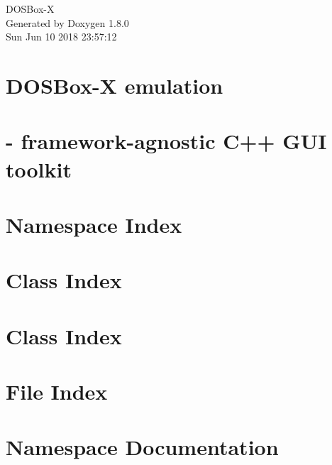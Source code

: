 \documentclass{book}
\begin{document}
\hypersetup{pageanchor=false,citecolor=blue}
\begin{titlepage}
\vspace*{7cm}
\begin{center}
{\Large D\-O\-S\-Box-\/\-X }\\
\vspace*{1cm}
{\large Generated by Doxygen 1.8.0}\\
\vspace*{0.5cm}
{\small Sun Jun 10 2018 23:57:12}\\
\end{center}
\end{titlepage}
\clearemptydoublepage
{}
\tableofcontents
\clearemptydoublepage
{}
\hypersetup{pageanchor=true,citecolor=blue}
\chapter{D\-O\-S\-Box-\/\-X emulation}
\label{index}\hypertarget{index}{}
\chapter{-\/ framework-\/agnostic C++ G\-U\-I toolkit}
\label{gui::tk}
\hypertarget{gui::tk}{}

\chapter{Namespace Index}

\chapter{Class Index}

\chapter{Class Index}

\chapter{File Index}

\chapter{Namespace Documentation}


\end{document}
